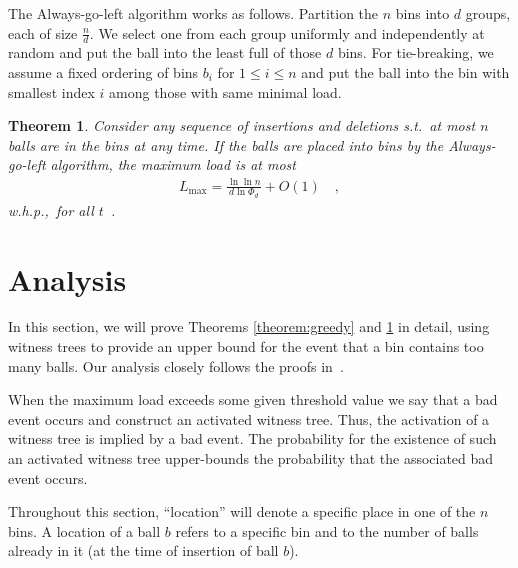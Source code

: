 \documentclass[a4paper,12pt]{article}
\newcommand\load{L_{\mathrm{max}}}
\newtheorem{theorem}{Theorem}
\begin{document}
The Always-go-left algorithm works as follows. Partition the $n$ bins into $d$ groups, each of size $\frac{n}{d}$. We select one from each group uniformly and independently at random and put the ball into the least full of those $d$ bins. For tie-breaking, we assume a fixed ordering of bins $b_i$ for $1 \leq i \leq n$ and put the ball into the bin with smallest index $i$ among those with same minimal load.

\begin{comment}
\begin{theorem}
\label{theorem:agln}
If $n$ balls are placed into $n$ bins using the Always-go-left scheme, the maximum load will be
\begin{align*}
\load \leq \frac{\ln\ln n}{d  \ln \Phi_d} + O(1)
\end{align*}
w.h.p.
\end{theorem}
\end{comment}

\begin{theorem}
\label{theorem:aglm}
Consider any sequence of insertions and deletions s.t.~at most $n$ balls are in the bins at any time. If the balls are placed into bins by the Always-go-left algorithm, the maximum load is at most 
\begin{align*}
\load = \frac{\ln\ln n}{d  \ln \Phi_d} + O(1) \quad ,
\end{align*}
w.h.p.,~for all $t$~\cite{VOC03}.
\end{theorem}

\section{Analysis}
\label{sec:analysis}
In this section, we will prove Theorems \ref{theorem:greedy} and \ref{theorem:aglm} in detail, using witness trees to provide an upper bound for the event that a bin contains too many balls. Our analysis closely follows the proofs in~\cite{VOC03}.

When the maximum load exceeds some given threshold value we say that a bad event occurs and construct an activated witness tree. Thus, the activation of a witness tree is implied by a bad event. The probability for the existence of such an activated witness tree upper-bounds the probability that the associated bad event occurs.

Throughout this section, ``location'' will denote a specific place in one of the $n$ bins. A location of a ball $b$ refers to a specific bin and to the number of balls already in it (at the time of insertion of ball $b$).
\end{document}
